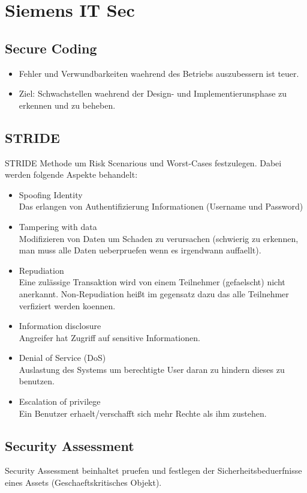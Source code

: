 \documentclass[a4paper, 12pt]{article}
\begin{document}
\section{Siemens IT Sec}
	\subsection{Secure Coding}
		\begin{itemize}
			\item Fehler und Verwundbarkeiten waehrend des Betriebs auszubessern ist teuer.
			\item Ziel: Schwachstellen waehrend der Design- und Implementierunsphase zu erkennen und zu beheben.
		\end{itemize}
	\subsection{STRIDE}
	STRIDE Methode um Risk Scenarious und Worst-Cases festzulegen. Dabei werden folgende Aspekte behandelt:
	\begin{itemize}
		\item Spoofing Identity \\
		Das erlangen von Authentifizierung Informationen (Username und Password)
		\item Tampering with data \\
		Modifizieren von Daten um Schaden zu verursachen (schwierig zu erkennen, man muss alle Daten ueberpruefen wenn es irgendwann auffaellt).
		\item Repudiation \\
		Eine zulässige Transaktion wird von einem Teilnehmer (gefaelscht) nicht anerkannt.
		Non-Repudiation heißt im gegensatz dazu das alle Teilnehmer verfiziert werden koennen.
		\item Information disclosure \\
		Angreifer hat Zugriff auf sensitive Informationen.
		\item Denial of Service (DoS) \\
		Auslastung des Systems um berechtigte User daran zu hindern dieses zu benutzen.
		\item Escalation of privilege \\
		Ein Benutzer erhaelt/verschafft sich mehr Rechte als ihm zustehen.
	\end{itemize}
	\subsection{Security Assessment}
	Security Assessment beinhaltet pruefen und festlegen der Sicherheitsbeduerfnisse eines Assets (Geschaeftskritisches Objekt). \\
\end{document}
